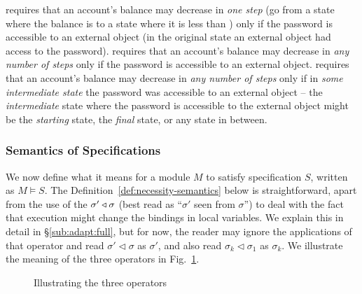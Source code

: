 \noindent
\SRobustNextAcc  requires that an account's balance may decrease in \emph{one step} (go from a state where the balance is 
to a state where it is less than ) only if the password is accessible to an external object (in the original state an external object had access to the password).
\SRobustIfAcc  requires that an account's balance may decrease in \emph{any number of steps}    only if the password is accessible to an external object.
\SRobustThroughAcc requires that an account's balance may decrease in \emph{any number of steps}    only if in \emph{some intermediate state} the password was accessible to an external object --  the   \emph{intermediate} state  where the password is accessible to the external object might be the \emph{starting}  
state, the \emph{final} state, or any state in between.

 


\subsubsection{Semantics of \Nec Specifications}
We now  define what it means for  a module  $M$ to satisfy specification  $S$, written as $M \vDash S$. The
 Definition~\ref{def:necessity-semantics} below is straightforward, apart from  
the use of the $\sigma' \triangleleft \sigma$  (best read as ``$\sigma'$ seen
from $\sigma$'')
to deal with the fact that execution might  change the bindings in local variables.
We explain this in detail in   \S \ref{sub:adapt:full}, but for now, the reader may ignore the applications of that operator and
read $\sigma' \triangleleft \sigma$ as $\sigma'$,
and also read ${\sigma_k \triangleleft \sigma_1}$ as  $\sigma_k$.
We illustrate the meaning of the three operators in 
Fig.~\ref{fig:Operators}.

%
%
\begin{figure}[htbp]

\caption{Illustrating the three \Nec operators}
\label{fig:Operators}
\end{figure}





